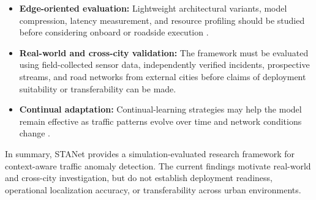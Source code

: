 \documentclass[journal]{IEEEtran}
\begin{document}
\begin{itemize}
  \item \textbf{Edge-oriented evaluation:} Lightweight architectural variants, model compression, latency measurement, and resource profiling should be studied before considering onboard or roadside execution \cite{cui_lane-flow-learning_2026}.
  \item \textbf{Real-world and cross-city validation:} The framework must be evaluated using field-collected sensor data, independently verified incidents, prospective streams, and road networks from external cities before claims of deployment suitability or transferability can be made.
  \item \textbf{Continual adaptation:} Continual-learning strategies may help the model remain effective as traffic patterns evolve over time and network conditions change \cite{francies_framework_2025}.
\end{itemize}

In summary, STANet provides a simulation-evaluated research framework for context-aware traffic anomaly detection. The current findings motivate real-world and cross-city investigation, but do not establish deployment readiness, operational localization accuracy, or transferability across urban environments.




\end{document}
